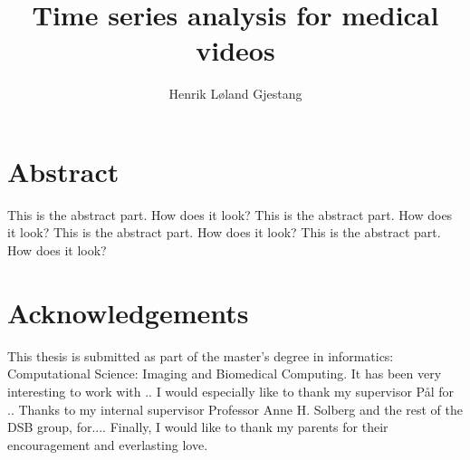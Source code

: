 \documentclass[english,a4paper,twoside]{report}
\title{Time series analysis for medical videos}
\author{Henrik Løland Gjestang}
\begin{document}

\duoforside[program={Computational Science},
  			dept={Department of Informatics},
  			option={Imaging and Biomedical Computing},
  			long]





\section*{Abstract}
This is the abstract part. How does it look? This is the abstract part. How does it look? This is the abstract part. How does it look? This is the abstract part. How does it look?

\cleardoublepage

\section*{Acknowledgements}
This thesis is submitted as part of the master's degree in informatics: Computational Science: Imaging and Biomedical Computing. It has been very interesting to work with ..
\medbreak \noindent
I would especially like to thank my supervisor Pål for ..
\medbreak \noindent
Thanks to my internal supervisor Professor Anne H. Solberg and the rest of the DSB group, for....
\medbreak \noindent
Finally, I would like to thank my parents for their encouragement and everlasting love.


\tableofcontents
{}
\listoffigures
{}
\listoftables



\cleardoublepage
\pagestyle{fancy}




\newpage
\printbibliography[heading=bibintoc]
\end{document}

